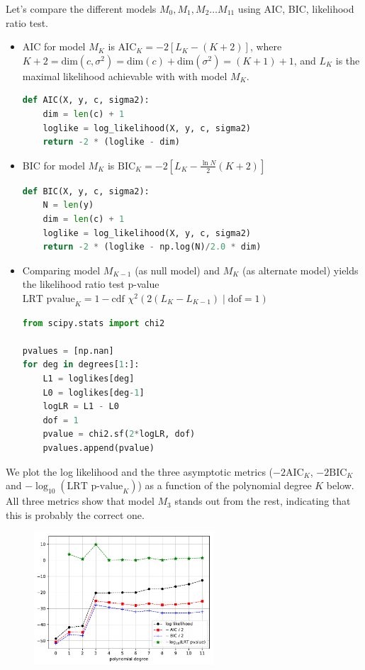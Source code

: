 \newpage
\no Let's compare the different models $M_0, M_1, M_2\ldots M_{11}$ using AIC, BIC, likelihood ratio test.
\begin{itemize}
	\item AIC for model $M_K$ is $\text{AIC}_K = -2 [L_K - (K+2)]$, where $K+2 = \text{dim}(c, \sigma^2) =  \text{dim}(c) + \text{dim}(\sigma^2) = (K+1) + 1$, and $L_K$ is the maximal likelihood achievable with with model $M_K$.
\begin{lstlisting}[language=python]
def AIC(X, y, c, sigma2):
	dim = len(c) + 1
	loglike = log_likelihood(X, y, c, sigma2)
	return -2 * (loglike - dim)
\end{lstlisting}

	\item BIC for model $M_K$ is $\text{BIC}_K = -2 [L_K - \frac{\ln N}{2}(K+2)]$
\begin{lstlisting}[language=python]
def BIC(X, y, c, sigma2):
	N = len(y)
	dim = len(c) + 1
	loglike = log_likelihood(X, y, c, sigma2)
	return -2 * (loglike - np.log(N)/2.0 * dim)
\end{lstlisting}

	\item Comparing model $M_{K-1}$ (as null model) and $M_K$ (as alternate model) yields the likelihood ratio test p-value $\text{LRT pvalue}_{K} = 1 - \text{cdf }\chi^2(2(L_K - L_{K-1})\;|\;\text{dof} = 1)$
\begin{lstlisting}[language=python]
from scipy.stats import chi2

pvalues = [np.nan]
for deg in degrees[1:]:
    L1 = loglikes[deg]
    L0 = loglikes[deg-1]
    logLR = L1 - L0
    dof = 1
    pvalue = chi2.sf(2*logLR, dof)
    pvalues.append(pvalue)
\end{lstlisting}
\end{itemize}

\no We plot the log likelihood and the three asymptotic metrics ($-2\text{AIC}_K$, $-2\text{BIC}_K$ and $-\log_{10}(\text{LRT p-value}_K)$) as a function of the polynomial degree $K$ below. All three metrics show that model $M_3$ stands out from the rest, indicating that this is probably the correct one.
\begin{figure}[h]
	\centering
	\includegraphics[width=0.60\textwidth]{./figs/03-linear-regression-LL-AIC-BIC-pvalue.pdf}
\end{figure}


